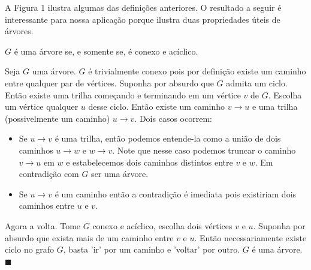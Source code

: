 A Figura 1 ilustra algumas das definições anteriores. O resultado a seguir é interessante para nossa aplicação porque ilustra duas propriedades úteis de árvores.

\begin{teo}
$G$ é uma árvore se, e somente se, é conexo e acíclico.
\end{teo}

\begin{prova}

Seja $G$ uma árvore. $G$ é trivialmente conexo pois por definição existe um caminho entre qualquer par de vértices. Suponha por absurdo que $G$ admita um ciclo. Então existe uma trilha começando e terminando em um vértice $v$ de $G$. Escolha um vértice qualquer $u$ desse ciclo. Então existe um caminho $v \to u $ e uma trilha (possivelmente um caminho) $u \to v$. Dois casos ocorrem:

\begin{itemize}
    \item Se $u \to v$ é uma trilha, então podemos entende-la como a união de dois caminhos $u \to w$ e $w \to v$. Note que nesse caso podemos truncar o caminho $v \to u$ em $w$ e estabelecemos dois caminhos distintos entre $v$ e $w$. Em contradição com $G$ ser uma árvore.

    \item Se $u \to v$ é um caminho então a contradição é imediata pois existiriam dois caminhos entre $u$ e $v$.
\end{itemize}


Agora a volta. Tome $G$ conexo e acíclico, escolha dois vértices $v$ e $u$. Suponha por absurdo que exista mais de um caminho entre $v$ e $u$. Então necessariamente existe ciclo no grafo $G$, basta 'ir' por um caminho e 'voltar' por outro. $G$ é uma árvore.
$\blacksquare$
\end{prova}





